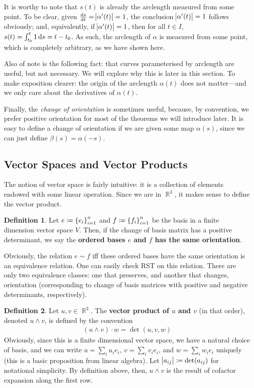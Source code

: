 \documentclass{amsart} %
\theoremstyle{mytheoremstyle}
\theoremstyle{definition}
\newtheorem{definition}{Definition}[section]
\numberwithin{equation}{section}
\DeclareMathOperator{\R}{\mathbb{R}}
\DeclareMathOperator{\1}{\mathbbm{1}}
\DeclareMathOperator{\D}{\dif}
\begin{document}
It is worthy to note that $s(t)$ is already the arclength measured from some point. To be clear, given $\frac{\D  s}{\D t} = \abs{\alpha'(t)} = 1$, the conclusion $\abs{\alpha'(t)} = 1$ follows obviously; and, equivalently, if $\abs{\alpha'(t)} = 1$, then for all $t \in I$, $s(t) = \int_{t_0}^{t} 1 \dif s = t - t_0$. As such, the arclength of $\alpha$ is measured from some point, which is completely arbitrary, as we have shown here.

Also of note is the following fact: that curves parameterised by arclength are useful, but not necessary. We will explore why this is later in this section. To make exposition clearer: the origin of the arclength $\alpha(t)$ does not matter---and we only care about the derivatives of $\alpha(t)$.

Finally, the \textit{change of orientation} is sometimes useful, because, by convention, we prefer positive orientation for most of the theorems we will introduce later. It is easy to define a change of orientation if we are given some map $\alpha(s)$, since we can just define $\beta(s) = \alpha(-s)$.


\subsection{Vector Spaces and Vector Products}

The notion of vector space is fairly intuitive: it is a collection of elements endowed with some linear operation. Since we are in $\R^3$, it makes sense to define the vector product.

\begin{definition}
	\label{deforientationvectorspace}
	Let $e \coloneqq \set{e_i}_{i=1}^{n}$ and $f \coloneqq \set{f_i}_{i=1}^{n}$ be the basis in a finite dimension vector space $V$. Then, if the change of basis matrix has a positive determinant, we say the \textbf{ordered bases $e$ and $f$ has the same orientation}.
\end{definition}

Obviously, the relation $e \sim f$ iff these ordered bases have the same orientation is an equivalence relation. One can easily check RST on this relation. There are only two equivalence classes: one that preserves, and another that changes, orientation (corresponding to change of basis matrices with positive and negative determinants, respectively).

\begin{definition}
	\label{defvectorproduct}
	Let $u,v \in \R^3$. The \textbf{vector product of $u$ and $v$} (in that order), denoted $u \wedge v$, is defined by the convention
	\begin{align}
	\label{eqdefvectorproductfund}
	(u \wedge v) \cdot w = \det(u,v,w)
	\end{align}
	Obviously, since this is a finite dimensional vector space, we have a natural choice of basis, and we can write $u = \sum_i u_i e_i$, $v = \sum_i v_i e_i$, and $w = \sum_i w_i e_i$ uniquely (this is a basic proposition from linear algebra). Let $\abs{a_{ij}} \coloneqq \det (a_{ij}) $ for notational simplicity. By definition above, then, $u \wedge v$ is the result of cofactor expansion along the first row.
\end{definition}
\end{document}
